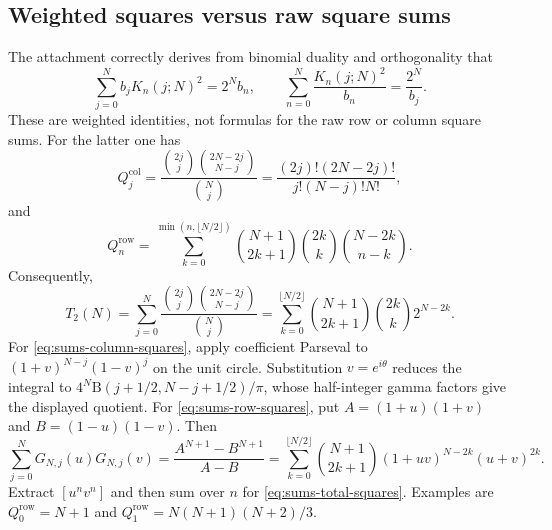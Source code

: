 \subsection{Weighted squares versus raw square sums}
The attachment correctly derives from binomial duality and orthogonality that
\begin{equation}\label{eq:sums-weighted-squares}
\sum_{j=0}^N b_jK_n(j;N)^2=2^Nb_n,\qquad
\sum_{n=0}^N\frac{K_n(j;N)^2}{b_n}=\frac{2^N}{b_j}.
\end{equation}
These are weighted identities, not formulas for the raw row or column square sums. For the latter one has
\begin{equation}\label{eq:sums-column-squares}
Q_j^{\mathrm{col}}=
\frac{\binom{2j}{j}\binom{2N-2j}{N-j}}{\binom Nj}
=\frac{(2j)!(2N-2j)!}{j!(N-j)!N!},
\end{equation}
and
\begin{equation}\label{eq:sums-row-squares}
Q_n^{\mathrm{row}}=\sum_{k=0}^{\min(n,\lfloor N/2\rfloor)}
\binom{N+1}{2k+1}\binom{2k}{k}\binom{N-2k}{n-k}.
\end{equation}
Consequently,
\begin{equation}\label{eq:sums-total-squares}
T_2(N)=\sum_{j=0}^N\frac{\binom{2j}{j}\binom{2N-2j}{N-j}}{\binom Nj}
=\sum_{k=0}^{\lfloor N/2\rfloor}\binom{N+1}{2k+1}\binom{2k}{k}2^{N-2k}.
\end{equation}
For \eqref{eq:sums-column-squares}, apply coefficient Parseval to $(1+v)^{N-j}(1-v)^j$ on the unit circle. Substitution $v=e^{i\theta}$ reduces the integral to
$4^N\mathrm B(j+1/2,N-j+1/2)/\pi$, whose half-integer gamma factors give the displayed quotient.
For \eqref{eq:sums-row-squares}, put $A=(1+u)(1+v)$ and $B=(1-u)(1-v)$. Then
\[
\sum_{j=0}^N G_{N,j}(u)G_{N,j}(v)
=\frac{A^{N+1}-B^{N+1}}{A-B}
=\sum_{k=0}^{\lfloor N/2\rfloor}\binom{N+1}{2k+1}(1+uv)^{N-2k}(u+v)^{2k}.
\]
Extract $[u^nv^n]$ and then sum over $n$ for \eqref{eq:sums-total-squares}. Examples are $Q_0^{\mathrm{row}}=N+1$ and $Q_1^{\mathrm{row}}=N(N+1)(N+2)/3$.

